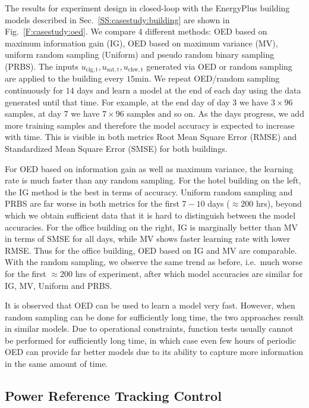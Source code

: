 The results for experiment design in closed-loop with the EnergyPlus building models described in Sec.~\ref{SS:casestudy:building} are shown in Fig.~\ref{F:casestudy:oed}.
We compare 4 different methods: OED based on maximum information gain (IG), OED based on maximum variance (MV), uniform random sampling (Uniform) and pseudo random binary sampling (PRBS).
The inputs \(u_{\mathrm{clg,t}},u_{\mathrm{sat,t}},u_{\mathrm{chw,t}}\) generated via OED or random sampling are applied to the building every \(15 \mathrm{min}\).
We repeat OED/random sampling continuously for \(14\) days and learn a model at the end of each day using the data generated until that time. 
For example, at the end day of day \(3\) we have \(3\times96\) samples, at day \(7\) we have \(7\times96\) samples and so on. 
As the days progress, we add more training samples and therefore the model accuracy is expected to increase with time. 
This is visible in both metrics Root Mean Square Error (RMSE) and Standardized Mean Square Error (SMSE) for both buildings.

For OED based on information gain as well as maximum variance, the learning rate is much faster than any random sampling.
For the hotel building on the left, the IG method is the best in terms of accuracy. %
Uniform random sampling and PRBS are far worse in both metrics for the first \(7-10\) days (\(\approx200\) hrs), beyond which we obtain sufficient data that it is hard to distinguish between the %
model accuracies.
For the office building on the right, IG is marginally better than MV in terms of SMSE for all days, while MV shows faster learning rate with lower RMSE. 
Thus for the office building, OED based on IG and MV are comparable. 
With the random sampling, we observe the same trend as before, i.e.~much worse for the first \(\approx200\) hrs of experiment, after which model accuracies are similar for IG, MV, Uniform and PRBS.

It is observed that OED can be used to learn a model very fast. However, when random sampling can be done for sufficiently long time, the two approaches result in similar models. Due to operational constraints, function tests usually cannot be performed for sufficiently long time, in which case even few hours of periodic OED can provide far better models due to its ability to capture more information in the same amount of time.


\subsection{Power Reference Tracking Control}
\label{SS:power_tracking}

